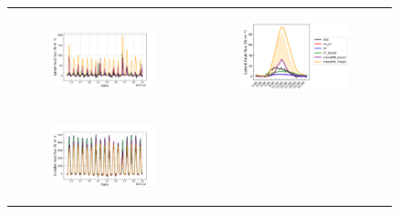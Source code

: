 \begin{figure}[hbtp]
    \centering
    \begin{tabular}{cc}
        \begin{subfigure}[t]{0.5\textwidth}
            \caption{}
            \includegraphics[width=\textwidth]{images/chap5/SOP_TS_DC/time_series_elsplans_flat.png}
        \end{subfigure} &
        \begin{subfigure}[t]{0.5\textwidth}
            \caption{}
            \includegraphics[width=\textwidth]{images/chap5/SOP_TS_DC/diurnal_cycle_elsplans_flat.png}
        \end{subfigure} \\
        \begin{subfigure}[t]{0.5\textwidth}
            \caption{}
            \includegraphics[width=\textwidth]{images/chap5/SOP_TS_DC/time_series_elsplans_sens.png}

\end{subfigure}
\end{tabular}
\end{figure}
